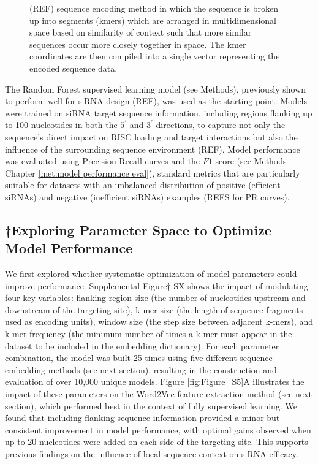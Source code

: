 \documentclass{report}
\begin{document}
\begin{figure}
{(REF) sequence encoding method in which the sequence is broken up into segments (kmers) which are arranged in multidimensional space based on similarity of context such that more similar sequences occur more closely together in space. The kmer coordinates are then compiled into a single vector representing the encoded sequence data.}
\label{fig:Figure† 2}
\end{figure}

The Random Forest supervised learning model (see Methods), previously shown to perform well for siRNA design (REF), was used as the starting point. Models were trained on siRNA target sequence information, including regions flanking up to 100 nucleotides in both the $5^\prime$ and $3^\prime$ directions, to capture not only the sequence’s direct impact on RISC loading and target interactions but also the influence of the surrounding sequence environment (REF). Model performance was evaluated using Precision-Recall curves and the $F1$-score (see Methods Chapter \ref{met:model performance eval}), standard metrics that are particularly suitable for datasets with an imbalanced distribution of positive (efficient siRNAs) and negative (inefficient siRNAs) examples (REFS for PR curves).

\subsection{†Exploring Parameter Space to Optimize Model Performance}

We first explored whether systematic optimization of model parameters could improve performance. Supplemental Figure† SX shows the impact of modulating four key variables: flanking region size (the number of nucleotides upstream and downstream of the targeting site), k-mer size (the length of sequence fragments used as encoding units), window size (the step size between adjacent k-mers), and k-mer frequency (the minimum number of times a k-mer must appear in the dataset to be included in the embedding dictionary). For each parameter combination, the model was built 25 times using five different sequence embedding methods (see next section), resulting in the construction and evaluation of over 10,000 unique models. Figure \ref{fig:Figure† S5}A illustrates the impact of these parameters on the Word2Vec feature extraction method (see next section), which performed best in the context of fully supervised learning. We found that including flanking sequence information provided a minor but consistent improvement in model performance, with optimal gains observed when up to 20 nucleotides were added on each side of the targeting site. This supports previous findings on the influence of local sequence context on siRNA efficacy.
\end{document}
